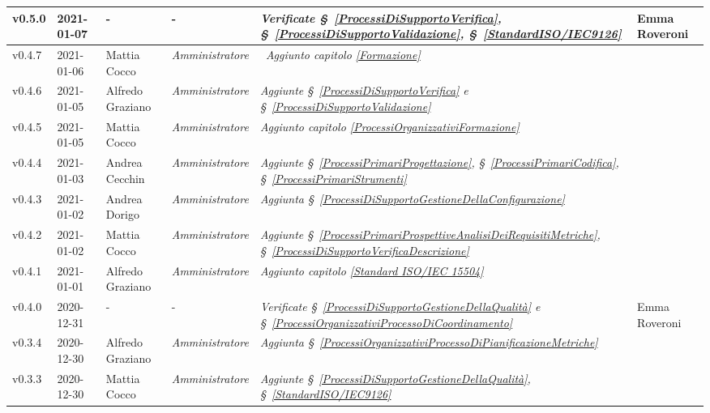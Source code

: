 {\begin{center}
\begin{longtable}[c]{|p{2cm-1\tabcolsep}|p{2cm}|p{3cm-2\tabcolsep}|p{3cm-1.5\tabcolsep}|p{}|p{3cm-2\tabcolsep}|}
		\hline
		\centering v0.5.0 & 2021-01-07 & \centering - & \centering -  & \textit{Verificate \S~\ref{ProcessiDiSupportoVerifica}, \S~\ref{ProcessiDiSupportoValidazione}, \S~\ref{StandardISO/IEC9126}} & Emma Roveroni \\
		\hline
		\centering v0.4.7 & 2021-01-06 & Mattia Cocco & \centering \textit{Amministratore}  & \	\textit{Aggiunto capitolo \ref{Formazione}} & \makecell[c]{-} \\
		\hline
		\centering v0.4.6 & 2021-01-05 & Alfredo Graziano & \centering \textit{Amministratore} &  \textit{Aggiunte  \S~\ref{ProcessiDiSupportoVerifica} e \S~\ref{ProcessiDiSupportoValidazione} } & \makecell[c]{-} \\
		\hline
		\centering v0.4.5 & 2021-01-05 & Mattia Cocco & \centering \textit{Amministratore}  & \textit{Aggiunto capitolo \ref{ProcessiOrganizzativiFormazione}}  & \makecell[c]{-}\\
		\hline
		\centering v0.4.4 & 2021-01-03 & Andrea Cecchin & \centering \textit{Amministratore} &  \textit{Aggiunte  \S~\ref{ProcessiPrimariProgettazione}, \S~\ref{ProcessiPrimariCodifica}, \S~\ref{ProcessiPrimariStrumenti}}  & \makecell[c]{-}\\
		\hline
		\centering v0.4.3 & 2021-01-02 & Andrea Dorigo & \centering \textit{Amministratore}  & \textit{Aggiunta  \S~\ref{ProcessiDiSupportoGestioneDellaConfigurazione}} & \makecell[c]{-}\\
		\hline
		\centering v0.4.2 & 2021-01-02 & Mattia Cocco & \centering \textit{Amministratore}  & \textit{Aggiunte  \S~\ref{ProcessiPrimariProspettiveAnalisiDeiRequisitiMetriche}, \S~\ref{ProcessiDiSupportoVerificaDescrizione}}  & \makecell[c]{-}\\
		\hline
		\centering v0.4.1 & 2021-01-01 & Alfredo Graziano & \centering \textit{Amministratore}  & \textit{Aggiunto capitolo \ref{Standard ISO/IEC 15504}} &\makecell[c]{-} \\
		\hline
		\centering v0.4.0 & 2020-12-31 & \centering - & \centering -  & \textit{Verificate  \S~\ref{ProcessiDiSupportoGestioneDellaQualità} e \S~\ref{ProcessiOrganizzativiProcessoDiCoordinamento} } & Emma Roveroni \\
		\hline
		\centering v0.3.4 & 2020-12-30 & Alfredo Graziano & \centering \textit{Amministratore} &  \textit{Aggiunta  \S~\ref{ProcessiOrganizzativiProcessoDiPianificazioneMetriche}} & \makecell[c]{-} \\
		\hline
		\centering v0.3.3 & 2020-12-30 & Mattia Cocco & \centering \textit{Amministratore}  & \textit{Aggiunte  \S~\ref{ProcessiDiSupportoGestioneDellaQualità}, \S~\ref{StandardISO/IEC9126} }  & \makecell[c]{-}\\

\end{longtable}
\end{center}}
